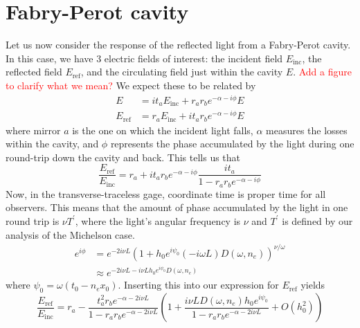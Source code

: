 \documentclass{article}
\begin{document}
\section*{Fabry-Perot cavity}

Let us now consider the response of the reflected light from a Fabry-Perot cavity. 
In this case, we have 3 electric fields of interest: the incident field $E_\mathrm{inc}$, the reflected field $E_\mathrm{ref}$, and the circulating field just within the cavity $E$.
\textcolor{red}{Add a figure to clarify what we mean?}
We expect these to be related by
\begin{align}
    E & = i t_a E_\mathrm{inc} + r_a r_b e^{-\alpha -i\phi} E \\
    E_\mathrm{ref} & = r_a E_\mathrm{inc} + i t_a r_b e^{-\alpha -i\phi} E
\end{align}
where mirror $a$ is the one on which the incident light falls, $\alpha$ measures the losses within the cavity, and $\phi$ represents the phase accumulated by the light during one round-trip down the cavity and back.
This tells us that 
\begin{equation}
    \frac{E_\mathrm{ref}}{E_\mathrm{inc}} = r_a + i t_a r_b e^{-\alpha -i\phi} \frac{i t_a}{1 - r_a r_b e^{-\alpha -i\phi}}
\end{equation}
Now, in the transverse-traceless gage, coordinate time is proper time for all observers.
This means that the amount of phase accumulated by the light in one round trip is $\nu T^\prime$, where the light's angular frequency is $\nu$ and $T^\prime$ is defined by our analysis of the Michelson case.
\begin{align}
    e^{i\phi} & = e^{-2i\nu L}\left(1 + h_0 e^{i\psi_0} (-i\omega L)D(\omega, n_e)\right)^{\nu/\omega} \\
              & \approx e^{-2i\nu L - i\nu L h_0 e^{i\psi_0} D(\omega, n_e)}
\end{align}
where $\psi_0 = \omega(t_0 - n_e x_0)$. 
Inserting this into our expression for $E_\mathrm{ref}$ yields
\begin{equation}
    \frac{E_\mathrm{ref}}{E_\mathrm{inc}} = r_a - \frac{t_a^2 r_b e^{-\alpha - 2i\nu L}}{1 - r_a r_b e^{-\alpha-2i\nu L}} \left( 1 + \frac{i\nu L D(\omega, n_e) h_0 e^{i\psi_0}}{1 - r_a r_b e^{-\alpha-2i\nu L}} + O(h_0^2) \right)
\end{equation}
\end{document}
